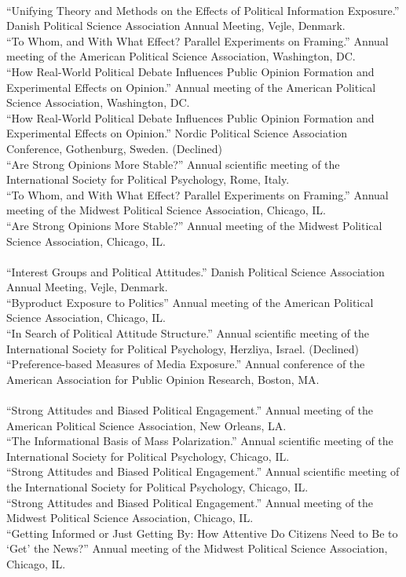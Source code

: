 \documentclass[12pt]{article}
\newcommand{\topic}[1]{\pagebreak[3]\indent {\color{lg}{\footnotesize #1 }}\\}
\newcommand{\entry}[1]{\indent {\color{lg}\guillemotright}\hspace{2pt}#1\vspace{.25em}\\}
\begin{document}
	\topic{Conference Papers (2014)}
	\entry{``Unifying Theory and Methods on the Effects of Political Information Exposure.'' Danish Political Science Association Annual Meeting, Vejle, Denmark.}
	\entry{``To Whom, and With What Effect? Parallel Experiments on Framing.'' Annual meeting of the American Political Science Association, Washington, DC.}
	\entry{``How Real-World Political Debate Influences Public Opinion Formation and Experimental Effects on Opinion.'' Annual meeting of the American Political Science Association, Washington, DC.}
	\entry{``How Real-World Political Debate Influences Public Opinion Formation and Experimental Effects on Opinion.'' Nordic Political Science Association Conference, Gothenburg, Sweden. (Declined)}
	\entry{``Are Strong Opinions More Stable?'' Annual scientific meeting of the International Society for Political Psychology, Rome, Italy.}
	\entry{``To Whom, and With What Effect? Parallel Experiments on Framing.'' Annual meeting of the Midwest Political Science Association, Chicago, IL.}
	\entry{``Are Strong Opinions More Stable?'' Annual meeting of the Midwest Political Science Association, Chicago, IL.}
	
	\topic{Conference Papers (2013)}
	\entry{``Interest Groups and Political Attitudes.'' Danish Political Science Association Annual Meeting, Vejle, Denmark.}
	\entry{``Byproduct Exposure to Politics'' Annual meeting of the American Political Science Association, Chicago, IL.}
	\entry{``In Search of Political Attitude Structure.'' Annual scientific meeting of the International Society for Political Psychology, Herzliya, Israel. (Declined)}
	\entry{``Preference-based Measures of Media Exposure.'' Annual conference of the American Association for Public Opinion Research, Boston, MA.}
	
	\topic{Conference Papers (2012)}
	\entry{``Strong Attitudes and Biased Political Engagement.'' Annual meeting of the American Political Science Association, New Orleans, LA.}
	\entry{``The Informational Basis of Mass Polarization.'' Annual scientific meeting of the International Society for Political Psychology, Chicago, IL.}
	\entry{``Strong Attitudes and Biased Political Engagement.'' Annual scientific meeting of the International Society for Political Psychology, Chicago, IL.}
	\entry{``Strong Attitudes and Biased Political Engagement.'' Annual meeting of the Midwest Political Science Association, Chicago, IL.}
	\entry{``Getting Informed or Just Getting By: How Attentive Do Citizens Need to Be to `Get' the News?'' Annual meeting of the Midwest Political Science Association, Chicago, IL.}
	
\end{document}
